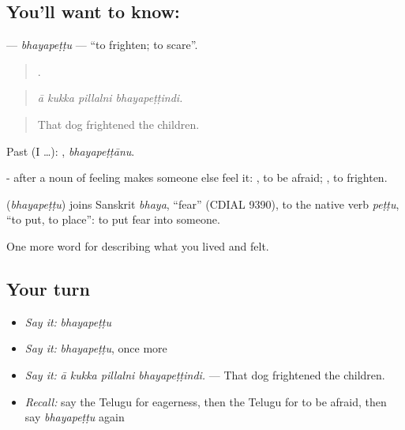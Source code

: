 \subsection*{You'll want to know: }
\textbf{} — \emph{bhayapeṭṭu} — \textquotedblleft{}to frighten; to scare\textquotedblright{}.

\begin{quote}
   .
\end{quote}

\begin{quote}
\emph{ā kukka pillalni bhayapeṭṭindi.}
\end{quote}

\begin{quote}
That dog frightened the children.
\end{quote}

Past (I …): , \emph{bhayapeṭṭānu}.

- after a noun of feeling makes someone else feel it: , to be afraid; , to frighten.

\begin{cousinweb}
\textbf{} (\emph{bhayapeṭṭu}) joins Sanskrit \emph{bhaya}, \textquotedblleft{}fear\textquotedblright{} (CDIAL 9390), to the native verb \emph{peṭṭu}, \textquotedblleft{}to put, to place\textquotedblright{}: to put fear into someone.
\end{cousinweb}

\begin{grammarlens}[title={What you've built}]
One more word for describing what you lived and felt.
\end{grammarlens}

\subsection*{Your turn}
\begin{itemize}
\raggedright
  \item \emph{Say it:} \emph{bhayapeṭṭu}
  \item \emph{Say it:} \emph{bhayapeṭṭu}, once more
  \item \emph{Say it:} \emph{ā kukka pillalni bhayapeṭṭindi.} — That dog frightened the children.
  \item \emph{Recall:} say the Telugu for eagerness, then the Telugu for to be afraid, then say \emph{bhayapeṭṭu} again
\end{itemize}

